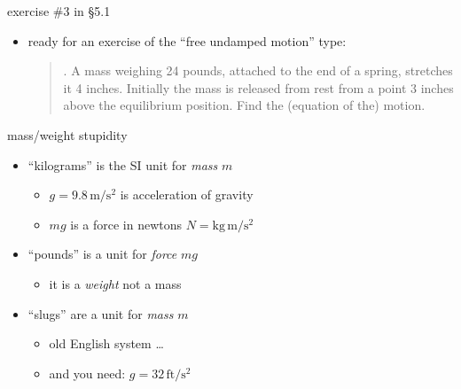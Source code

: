 \documentclass[urlcolor=blue]{beamer}
\begin{document}
\begin{frame}{exercise \#3 in \S5.1}

\begin{itemize}
\item ready for an exercise of the ``free undamped motion'' type:

\begin{quotation}
. A mass weighing 24 pounds, attached to the end of a spring, stretches it 4 inches.  Initially the mass is released from rest from a point 3 inches above the equilibrium position.  Find the (equation of the) motion.
\end{quotation}
\end{itemize}

\vspace{40mm}
\end{frame}


\begin{frame}{mass/weight stupidity}

\begin{itemize}
\item ``kilograms'' is the SI unit for \emph{mass} $m$
    \begin{itemize}
    \item $g=9.8 \,\text{m}/\text{s}^2$ is acceleration of gravity
    \item $mg$ is a force in newtons $N = \text{kg}\,\text{m}/\text{s}^2$
    \end{itemize}
\item ``pounds'' is a unit for \emph{force} $mg$
    \begin{itemize}
    \item it is a \emph{weight} not a mass
    \end{itemize}
\item ``slugs'' are a unit for \emph{mass} $m$
    \begin{itemize}
    \item old English system \dots
    \item and you need: $g=32 \,\text{ft}/\text{s}^2$
    \end{itemize}
\end{itemize}
\end{frame}
\end{document}
